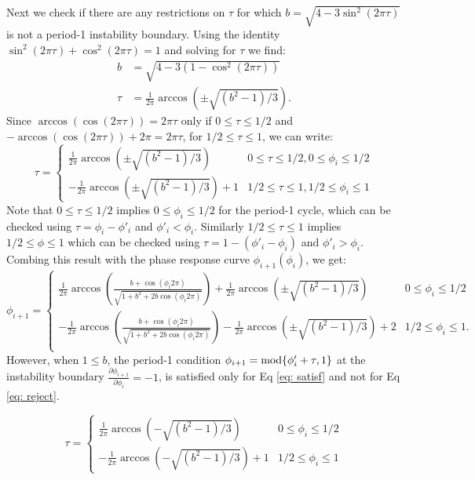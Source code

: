 Next we check if there are any restrictions on $\tau$ for which $b = \sqrt{4-3\sin^2(2\pi\tau)}$ is not a period-1 instability boundary. Using the identity $\sin^2(2\pi\tau) + \cos^2(2\pi\tau) = 1$ and solving for $\tau$ we find:
\begin{align}
    b &= \sqrt{4-3(1-\cos^2(2\pi\tau))}\\
    \tau &= \frac{1}{2\pi}\arccos(\pm\sqrt{(b^2 - 1)/3}).
\end{align}
Since $\arccos(\cos(2\pi \tau)) = 2\pi \tau$ only if $0 \leq \tau \leq 1/2$ and $-\arccos(\cos(2\pi \tau)) +2\pi= 2\pi \tau$, for $1/2 \leq \tau \leq 1$, we can write:
\begin{equation} 
\tau =
\begin{cases}
        \frac{1}{2\pi}\arccos(\pm\sqrt{(b^2 - 1)/3}) & 0 \leq \tau \leq 1/2, 0 \leq \phi_i \leq 1/2 \\
       -\frac{1}{2\pi}\arccos(\pm\sqrt{(b^2 - 1)/3}) + 1 & 1/2 \leq \tau \leq 1, 1/2 \leq \phi_i \leq 1
    \end{cases}
\end{equation}
Note that $0 \leq \tau \leq 1/2$ implies $0 \leq \phi_i \leq 1/2$ for the period-1 cycle, which can be checked using $\tau = \phi_i - \phi'_i$ and $\phi'_i<\phi_i$. Similarly $1/2 \leq \tau \leq 1$ implies $1/2 \leq \phi \leq 1$ which can be checked using $\tau = 1-(\phi'_i - \phi_i)$ and $\phi'_i>\phi_i$.\\

\noindent Combing this result with the phase response curve $\phi_{i+1}(\phi_i)$, we get:
\begin{equation} \phi_{i+1} =
\begin{cases}
        \frac{1}{2\pi}\arccos(\frac{b+\cos(\phi_i 2\pi)}{\sqrt{1+b^2+2b\cos(\phi_i 2\pi)}}) + \frac{1}{2\pi}\arccos(\pm\sqrt{(b^2 - 1)/3}) & 0 \leq \phi_i \leq 1/2 \\
       -\frac{1}{2\pi}\arccos(\frac{b+\cos(\phi_i 2\pi)}{\sqrt{1+b^2+2b\cos(\phi_i 2\pi)}}) -\frac{1}{2\pi}\arccos(\pm\sqrt{(b^2 - 1)/3}) + 2& 1/2 \leq \phi_i \leq 1. \\
    \end{cases}
\end{equation}
However, when $1\leq b$, the period-1 condition $\phi_{i+1} = \textnormal{mod} \{\phi'_i + \tau,1\}$ at the instability boundary $\frac{\partial \phi_{i+1}}{\partial \phi_i} = -1$, is satisfied only for Eq \ref{eq: satisf} and not for Eq \ref{eq: reject}.

\begin{equation} 
    \tau =
    \begin{cases}
        \frac{1}{2\pi}\arccos(-\sqrt{(b^2 - 1)/3}) & 0 \leq \phi_i \leq 1/2 \\
       -\frac{1}{2\pi}\arccos(-\sqrt{(b^2 - 1)/3}) + 1 & 1/2 \leq \phi_i \leq 1
    \end{cases}
    \label{eq: satisf}
\end{equation} 

